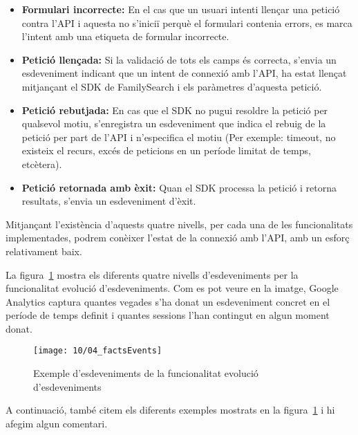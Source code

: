     \begin{itemize}
        \item \textbf{Formulari incorrecte:} En el cas que un usuari intenti llençar una petició contra l'API i aquesta no s'iniciï perquè el formulari contenia errors, es marca l'intent amb una etiqueta de formular incorrecte.
        \item \textbf{Petició llençada:} Si la validació de tots els camps és correcta, s'envia un esdeveniment indicant que un intent de connexió amb l'API, ha estat llençat mitjançant el SDK de FamilySearch i els paràmetres d'aquesta petició.
        \item \textbf{Petició rebutjada:} En cas que el SDK no pugui resoldre la petició per qualsevol motiu, s'enregistra un esdeveniment que indica el rebuig de la petició per part de l'API i n'especifica el motiu (Per exemple: timeout, no existeix el recurs, excés de peticions en un període limitat de temps, etcètera).
        \item \textbf{Petició retornada amb èxit:} Quan el SDK processa la petició i retorna resultats, s'envia un esdeveniment d'èxit.
    \end{itemize}

    Mitjançant l'existència d'aquests quatre nivells, per cada una de les funcionalitats implementades, podrem conèixer l'estat de la connexió amb l'API, amb un esforç relativament baix.

    La figura~\ref{img:factsEvents} mostra els diferents quatre nivells d'esdeveniments per la funcio\-na\-litat evolució d'esdeveniments. Com es pot veure en la imatge, Google Analytics captura quantes vegades s'ha donat un esdeveniment concret en el període de temps definit i quantes sessions l'han contingut en algun moment donat.

    \begin{figure}[h]
        \texttt{[image: 10/04\_factsEvents]}
        \centering
        \caption{Exemple d'esdeveniments de la funcionalitat evolució d'esdeveniments}\label{img:factsEvents}
    \end{figure}

    A continuació, també citem els diferents exemples mostrats en la figura~\ref{img:factsEvents} i hi afegim algun comentari.

